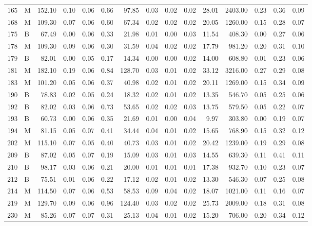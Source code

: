 \begin{table}[ht]
\begin{tabular}{rlrrrrrrrrrrrrr}
  165 & M & 152.10 & 0.10 & 0.06 & 0.66 & 97.85 & 0.03 & 0.02 & 0.02 & 28.01 & 2403.00 & 0.23 & 0.36 & 0.09 \\ 
  168 & M & 109.30 & 0.07 & 0.06 & 0.60 & 67.34 & 0.02 & 0.02 & 0.02 & 20.05 & 1260.00 & 0.15 & 0.28 & 0.07 \\ 
  175 & B & 67.49 & 0.00 & 0.06 & 0.33 & 21.98 & 0.01 & 0.00 & 0.03 & 11.54 & 408.30 & 0.00 & 0.27 & 0.06 \\ 
  178 & M & 109.30 & 0.09 & 0.06 & 0.30 & 31.59 & 0.04 & 0.02 & 0.02 & 17.79 & 981.20 & 0.20 & 0.31 & 0.10 \\ 
  179 & B & 82.01 & 0.00 & 0.05 & 0.17 & 14.34 & 0.00 & 0.00 & 0.02 & 14.00 & 608.80 & 0.01 & 0.23 & 0.06 \\ 
  181 & M & 182.10 & 0.19 & 0.06 & 0.84 & 128.70 & 0.03 & 0.01 & 0.02 & 33.12 & 3216.00 & 0.27 & 0.29 & 0.08 \\ 
  183 & M & 101.20 & 0.05 & 0.06 & 0.37 & 40.98 & 0.02 & 0.01 & 0.02 & 20.11 & 1269.00 & 0.15 & 0.34 & 0.09 \\ 
  190 & B & 78.83 & 0.02 & 0.05 & 0.24 & 18.32 & 0.02 & 0.01 & 0.02 & 13.35 & 546.70 & 0.05 & 0.25 & 0.06 \\ 
  192 & B & 82.02 & 0.03 & 0.06 & 0.73 & 53.65 & 0.02 & 0.02 & 0.03 & 13.75 & 579.50 & 0.05 & 0.22 & 0.07 \\ 
  193 & B & 60.73 & 0.00 & 0.06 & 0.35 & 21.69 & 0.01 & 0.00 & 0.04 & 9.97 & 303.80 & 0.00 & 0.19 & 0.07 \\ 
  194 & M & 81.15 & 0.05 & 0.07 & 0.41 & 34.44 & 0.04 & 0.01 & 0.02 & 15.65 & 768.90 & 0.15 & 0.32 & 0.12 \\ 
  202 & M & 115.10 & 0.07 & 0.05 & 0.40 & 40.73 & 0.03 & 0.01 & 0.02 & 20.42 & 1239.00 & 0.19 & 0.29 & 0.08 \\ 
  209 & B & 87.02 & 0.05 & 0.07 & 0.19 & 15.09 & 0.03 & 0.01 & 0.03 & 14.55 & 639.30 & 0.11 & 0.41 & 0.11 \\ 
  210 & B & 98.17 & 0.03 & 0.06 & 0.21 & 20.00 & 0.01 & 0.01 & 0.01 & 17.38 & 932.70 & 0.10 & 0.23 & 0.07 \\ 
  212 & B & 75.51 & 0.01 & 0.06 & 0.22 & 17.12 & 0.02 & 0.01 & 0.02 & 13.30 & 546.30 & 0.07 & 0.25 & 0.08 \\ 
  214 & M & 114.50 & 0.07 & 0.06 & 0.53 & 58.53 & 0.09 & 0.04 & 0.02 & 18.07 & 1021.00 & 0.11 & 0.16 & 0.07 \\ 
  219 & M & 129.70 & 0.09 & 0.06 & 0.96 & 124.40 & 0.03 & 0.02 & 0.02 & 25.73 & 2009.00 & 0.18 & 0.31 & 0.08 \\ 
  230 & M & 85.26 & 0.07 & 0.07 & 0.31 & 25.13 & 0.04 & 0.01 & 0.02 & 15.20 & 706.00 & 0.20 & 0.34 & 0.12 \\ 

\end{tabular}
\end{table}
